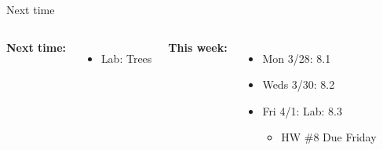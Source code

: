 \documentclass[aspectratio=169,usenames,dvipsnames]{beamer}
\begin{document}
\begin{frame}[t]{Next time}


\begin{columns}
\centering

\textbf{Next time:}

\begin{itemize}
	\item Lab: Trees
\end{itemize}

\centering

\textbf{This week:}
\begin{itemize}

	\item Mon 3/28: 8.1
	\item Weds 3/30: 8.2
	\item Fri 4/1: Lab: 8.3
	\begin{itemize}
		\item HW \#8 Due Friday
	\end{itemize}
\end{itemize}
	\end{columns}

\end{frame}
\end{document}
